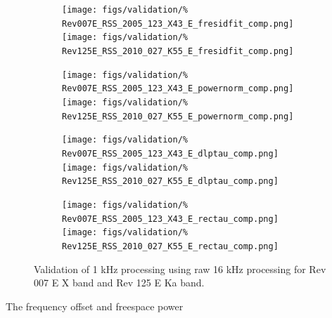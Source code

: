 \documentclass[titlepage, 12pt]{article}
\begin{document}
            \begin{figure}[!ht]
                \centering
                \begin{subfigure}[b]{0.94\textwidth}
                    \texttt{[image: figs/validation/\%
                         Rev007E\_RSS\_2005\_123\_X43\_E\_fresidfit\_comp.png]}
                    \texttt{[image: figs/validation/\%
                         Rev125E\_RSS\_2010\_027\_K55\_E\_fresidfit\_comp.png]}
                \end{subfigure}
                \hfill
                \begin{subfigure}[b]{0.94\textwidth}
                    \texttt{[image: figs/validation/\%
                         Rev007E\_RSS\_2005\_123\_X43\_E\_powernorm\_comp.png]}
                    \texttt{[image: figs/validation/\%
                         Rev125E\_RSS\_2010\_027\_K55\_E\_powernorm\_comp.png]}
                \end{subfigure}
                \hfill
                \begin{subfigure}[b]{0.94\textwidth}
                    \texttt{[image: figs/validation/\%
                         Rev007E\_RSS\_2005\_123\_X43\_E\_dlptau\_comp.png]}
                    \texttt{[image: figs/validation/\%
                         Rev125E\_RSS\_2010\_027\_K55\_E\_dlptau\_comp.png]}
                \end{subfigure}
                \hfill
                \begin{subfigure}[b]{0.94\textwidth}
                    \texttt{[image: figs/validation/\%
                         Rev007E\_RSS\_2005\_123\_X43\_E\_rectau\_comp.png]}
                    \texttt{[image: figs/validation/\%
                         Rev125E\_RSS\_2010\_027\_K55\_E\_rectau\_comp.png]}
                \end{subfigure}
                \caption{Validation of 1 kHz processing using raw 16 kHz
                         processing for Rev 007 E X band and Rev 125 E Ka band.}
                \label{fig:1vs16khz}
            \end{figure}
            The frequency offset and freespace power
\end{document}
